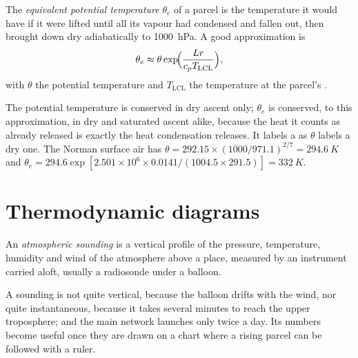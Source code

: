 \begin{definition}\label{def:b2:atmospheric-thermodynamics:theta-e}
The \emph{equivalent potential temperature} $\theta_e$ of
a parcel is the temperature it would have if it were lifted until all its vapour had condensed
and fallen out, then brought down dry adiabatically to \qty{1000}{hPa}. A good approximation is
\[
  \theta_e \approx \theta \exp\!\Bigl(\frac{L r}{c_p T_{\text{LCL}}}\Bigr),
\]
with $\theta$ the potential temperature and $T_{\text{LCL}}$ the temperature at the parcel's
.
\end{definition}

The potential temperature is conserved in dry ascent only; $\theta_e$ is conserved, to this
approximation, in dry and saturated ascent alike, because the heat it counts as already released
is exactly the heat condensation releases. It labels a  as $\theta$ labels a dry one.
The Norman surface air has $\theta = 292.15 \times (1000/971.1)^{2/7} = \qty{294.6}{K}$ and
$\theta_e = 294.6 \exp[2.501 \times 10^6 \times 0.0141/(1004.5 \times 291.5)] = \qty{332}{K}$.

\section{Thermodynamic diagrams}\label{sec:b2:atmospheric-thermodynamics:diagrams}

\begin{definition}\label{def:b2:atmospheric-thermodynamics:sounding}
An \emph{atmospheric sounding} is a vertical profile of the
pressure, temperature, humidity and wind of the atmosphere above a place, measured by an
instrument carried aloft, usually a radiosonde under a balloon.
\end{definition}

A sounding is not quite vertical, because the balloon drifts with the wind, nor quite
instantaneous, because it takes several minutes to reach the upper troposphere; and the main
network launches only twice a day. Its numbers become useful once they are drawn on a chart
where a rising parcel can be followed with a ruler.

